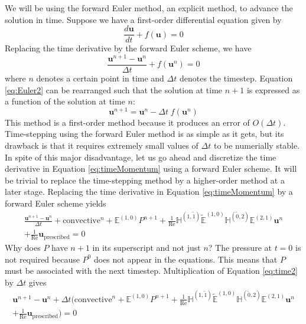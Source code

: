 We will be using the forward Euler method, an explicit method, to advance the solution in time. Suppose we have a first-order differential equation given by
\begin{equation}
    \label{eq:Euler1}
    \frac{d \mathbf{u}}{dt} + f(\mathbf{u}) = 0
\end{equation}
Replacing the time derivative by the forward Euler scheme, we have
\begin{equation}
    \label{eq:Euler2}
    \frac{\mathbf{u}^{n+1} - \mathbf{u}^{n}}{\Delta t} + f(\mathbf{u}^{n}) = 0
\end{equation}
where $n$ denotes a certain point in time and $\Delta t$ denotes the timestep. Equation \eqref{eq:Euler2} can be rearranged such that the solution at time $n+1$ is expressed as a function of the solution at time $n$:
\begin{equation}
    \label{eq:time1}
    \mathbf{u}^{n+1} = \mathbf{u}^{n} - \Delta t \; f(\mathbf{u}^{n})
\end{equation}
This method is a first-order method because it produces an error of $O(\Delta t)$. Time-stepping using the forward Euler method is as simple as it gets, but its drawback is that it requires extremely small values of $\Delta t$ to be numerially stable. In spite of this major disadvantage, let us go ahead and discretize the time derivative in Equation \eqref{eq:timeMomentum} using a forward Euler scheme. It will be trivial to replace the time-stepping method by a higher-order method at a later stage. Replacing the time derivative in Equation \eqref{eq:timeMomentum} by a forward Euler scheme yields
\begin{multline}
    \label{eq:time2}
    \frac{\mathbf{u}^{n+1} - \mathbf{u}^{n}}{\Delta t} + \text{convective}^{n} + \mathbb{E}^{(1,0)} P^{n+1} + \frac{1}{\text{Re}} \mathbb{H}^{(1,\tilde{1})} \tilde{\mathbb{E}}^{(1,0)} \mathbb{H}^{(\tilde{0},2)} \mathbb{E}^{(2,1)} \mathbf{u}^{n} \\
    + \frac{1}{\text{Re}} \mathbf{u}_{\text{prescribed}} = 0
\end{multline}
Why does $P$ have $n + 1$ in its superscript and not just $n$? The pressure at $t = 0$ is not required because $P^0$ does not appear in the equations. This means that $P$ must be associated with the next timestep. Multiplication of Equation \eqref{eq:time2} by $\Delta t$ gives
\begin{multline}
    \label{eq:time3}
    \mathbf{u}^{n+1} - \mathbf{u}^{n} + \Delta t \biggl( \text{convective}^{n} + \mathbb{E}^{(1,0)} P^{n+1} + \frac{1}{\text{Re}} \mathbb{H}^{(1,\tilde{1})} \tilde{\mathbb{E}}^{(1,0)} \mathbb{H}^{(\tilde{0},2)} \mathbb{E}^{(2,1)} \mathbf{u}^{n} \\
    + \frac{1}{\text{Re}} \mathbf{u}_{\text{prescribed}} \biggr) = 0
\end{multline}
